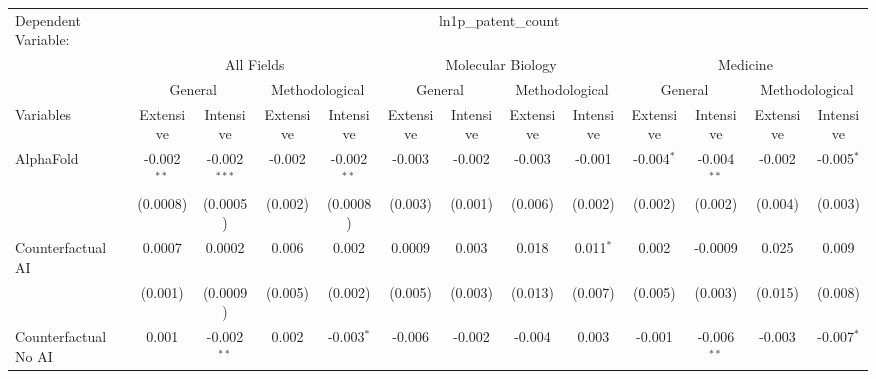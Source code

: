 \begingroup
\centering
\begin{tabular}{lcccccccccccc}
   \tabularnewline \midrule \midrule
   Dependent Variable: & \multicolumn{12}{c}{ln1p\_patent\_count}\\
 & \multicolumn{4}{c}{All Fields} & \multicolumn{4}{c}{Molecular Biology} & \multicolumn{4}{c}{Medicine} \\
\cmidrule(lr){2-5} \cmidrule(lr){6-9} \cmidrule(lr){10-13}
 & \multicolumn{2}{c}{General} & \multicolumn{2}{c}{Methodological} & \multicolumn{2}{c}{General} & \multicolumn{2}{c}{Methodological} & \multicolumn{2}{c}{General} & \multicolumn{2}{c}{Methodological} \\
\cmidrule(lr){2-3} \cmidrule(lr){4-5} \cmidrule(lr){6-7} \cmidrule(lr){8-9} \cmidrule(lr){10-11} \cmidrule(lr){12-13}
Variables & \multicolumn{1}{c}{Extensive} & \multicolumn{1}{c}{Intensive} & \multicolumn{1}{c}{Extensive} & \multicolumn{1}{c}{Intensive} & \multicolumn{1}{c}{Extensive} & \multicolumn{1}{c}{Intensive} & \multicolumn{1}{c}{Extensive} & \multicolumn{1}{c}{Intensive} & \multicolumn{1}{c}{Extensive} & \multicolumn{1}{c}{Intensive} & \multicolumn{1}{c}{Extensive} & \multicolumn{1}{c}{Intensive} \\
\cmidrule(lr){1-1}\cmidrule(lr){2-2} \cmidrule(lr){3-3} \cmidrule(lr){4-4} \cmidrule(lr){5-5} \cmidrule(lr){6-6} \cmidrule(lr){7-7} \cmidrule(lr){8-8} \cmidrule(lr){9-9} \cmidrule(lr){10-10} \cmidrule(lr){11-11} \cmidrule(lr){12-12} \cmidrule(lr){13-13}
   AlphaFold                                & -0.002$^{**}$ & -0.002$^{***}$ & -0.002  & -0.002$^{**}$ & -0.003  & -0.002   & -0.003  & -0.001      & -0.004$^{*}$ & -0.004$^{**}$ & -0.002  & -0.005$^{*}$\\   
                                            & (0.0008)      & (0.0005)       & (0.002) & (0.0008)      & (0.003) & (0.001)  & (0.006) & (0.002)     & (0.002)      & (0.002)       & (0.004) & (0.003)\\   
   Counterfactual AI                        & 0.0007        & 0.0002         & 0.006   & 0.002         & 0.0009  & 0.003    & 0.018   & 0.011$^{*}$ & 0.002        & -0.0009       & 0.025   & 0.009\\   
                                            & (0.001)       & (0.0009)       & (0.005) & (0.002)       & (0.005) & (0.003)  & (0.013) & (0.007)     & (0.005)      & (0.003)       & (0.015) & (0.008)\\   
   Counterfactual No AI                     & 0.001         & -0.002$^{**}$  & 0.002   & -0.003$^{*}$  & -0.006  & -0.002   & -0.004  & 0.003       & -0.001       & -0.006$^{**}$ & -0.003  & -0.007$^{*}$\\   

\end{tabular}
